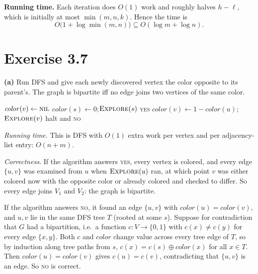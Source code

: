 \documentclass[11pt]{article}
\theoremstyle{definition}
\begin{document}
\textbf{Running time.} Each iteration does $O(1)$ work and roughly halves $h-\ell$, which is initially at most
$\min(m,n,k)$. Hence the time is
\[
  O\bigl(1+\log\min(m,n)\bigr)\subseteq \boxed{O(\log m+\log n)}.
\]

\section*{Exercise 3.7}

\textbf{(a)} Run DFS and give each newly discovered vertex the color opposite to its parent's. The graph is
bipartite iff no edge joins two vertices of the same color.

\begin{algorithm}[H]
\caption{Testing bipartiteness}
\begin{algorithmic}[1]
   \State $\mathit{color}(v)\gets\textsc{nil}$ \EndFor
      \State $\mathit{color}(s)\gets0$;\quad $\Call{Explore}{s}$
    \EndIf
  \EndFor
  \State \Return \textsc{yes} 
\EndFunction
\Statex
{}
      \State $\mathit{color}(v)\gets1-\mathit{color}(u)$;\quad $\Call{Explore}{v}$
      \State halt and \Return \textsc{no}
    \EndIf
  \EndFor
\EndProcedure
\end{algorithmic}
\end{algorithm}

\emph{Running time.} This is DFS with $O(1)$ extra work per vertex and per adjacency-list entry: $O(n+m)$.

\emph{Correctness.}
If the algorithm answers \textsc{yes}, every vertex is colored, and every edge $\{u,v\}$ was examined from $u$ when
$\textsc{Explore}(u)$ ran, at which point $v$ was either colored now with the opposite color or already colored
and checked to differ. So every edge joins $V_1$ and $V_2$: the graph is bipartite.

If the algorithm answers \textsc{no}, it found an edge $\{u,v\}$ with $\mathit{color}(u)=\mathit{color}(v)$, and
$u,v$ lie in the same DFS tree $T$ (rooted at some $s$). Suppose for contradiction that $G$ had a bipartition,
i.e.\ a function $c:V\to\{0,1\}$ with $c(x)\neq c(y)$ for every edge $\{x,y\}$. Both $c$ and $\mathit{color}$
change value across every tree edge of $T$, so by induction along tree paths from $s$,
$c(x)=c(s)\oplus\mathit{color}(x)$ for all $x\in T$. Then $\mathit{color}(u)=\mathit{color}(v)$ gives
$c(u)=c(v)$, contradicting that $\{u,v\}$ is an edge. So \textsc{no} is correct.
\end{document}

